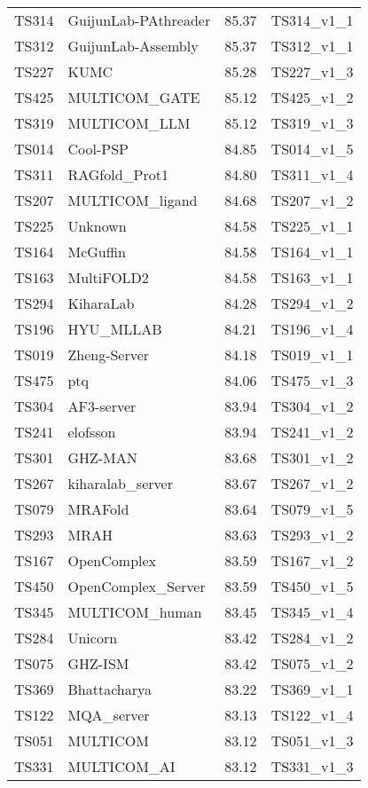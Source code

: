 \begin{longtable}{llll}
TS314 & GuijunLab-PAthreader & 85.37 & TS314\_v1\_1 \\ 
TS312 & GuijunLab-Assembly & 85.37 & TS312\_v1\_1 \\ 
TS227 & KUMC & 85.28 & TS227\_v1\_3 \\ 
TS425 & MULTICOM\_GATE & 85.12 & TS425\_v1\_2 \\ 
TS319 & MULTICOM\_LLM & 85.12 & TS319\_v1\_3 \\ 
TS014 & Cool-PSP & 84.85 & TS014\_v1\_5 \\ 
TS311 & RAGfold\_Prot1 & 84.80 & TS311\_v1\_4 \\ 
TS207 & MULTICOM\_ligand & 84.68 & TS207\_v1\_2 \\ 
TS225 & Unknown & 84.58 & TS225\_v1\_1 \\ 
TS164 & McGuffin & 84.58 & TS164\_v1\_1 \\ 
TS163 & MultiFOLD2 & 84.58 & TS163\_v1\_1 \\ 
TS294 & KiharaLab & 84.28 & TS294\_v1\_2 \\ 
TS196 & HYU\_MLLAB & 84.21 & TS196\_v1\_4 \\ 
TS019 & Zheng-Server & 84.18 & TS019\_v1\_1 \\ 
TS475 & ptq & 84.06 & TS475\_v1\_3 \\ 
TS304 & AF3-server & 83.94 & TS304\_v1\_2 \\ 
TS241 & elofsson & 83.94 & TS241\_v1\_2 \\ 
TS301 & GHZ-MAN & 83.68 & TS301\_v1\_2 \\ 
TS267 & kiharalab\_server & 83.67 & TS267\_v1\_2 \\ 
TS079 & MRAFold & 83.64 & TS079\_v1\_5 \\ 
TS293 & MRAH & 83.63 & TS293\_v1\_2 \\ 
TS167 & OpenComplex & 83.59 & TS167\_v1\_2 \\ 
TS450 & OpenComplex\_Server & 83.59 & TS450\_v1\_5 \\ 
TS345 & MULTICOM\_human & 83.45 & TS345\_v1\_4 \\ 
TS284 & Unicorn & 83.42 & TS284\_v1\_2 \\ 
TS075 & GHZ-ISM & 83.42 & TS075\_v1\_2 \\ 
TS369 & Bhattacharya & 83.22 & TS369\_v1\_1 \\ 
TS122 & MQA\_server & 83.13 & TS122\_v1\_4 \\ 
TS051 & MULTICOM & 83.12 & TS051\_v1\_3 \\ 
TS331 & MULTICOM\_AI & 83.12 & TS331\_v1\_3 \\ 

\end{longtable}
